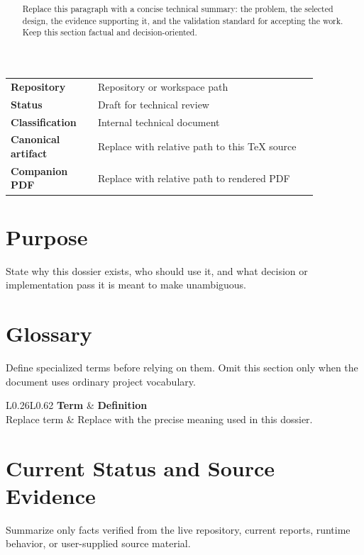 \documentclass[11pt]{article}
\title{\dossiertitle\\[0.35em]\large\dossiersubtitle}
\author{\dossierauthor}
\date{\preparedtimestamp}
\newcommand{\repo}{Repository or workspace path}
\newcommand{\artifactstatus}{Draft for technical review}
\newcommand{\classification}{Internal technical document}
\begin{document}
\maketitle

\begin{center}
\begin{tabular}{>{\bfseries}p{0.24\linewidth}p{0.62\linewidth}}
Repository & \repo \\
Status & \artifactstatus \\
Classification & \classification \\
Canonical artifact & Replace with relative path to this TeX source \\
Companion PDF & Replace with relative path to rendered PDF \\
\end{tabular}
\end{center}

\begin{abstract}
Replace this paragraph with a concise technical summary: the problem, the selected design, the evidence supporting it, and the validation standard for accepting the work. Keep this section factual and decision-oriented.
\end{abstract}

\tableofcontents
\newpage

\section{Purpose}
State why this dossier exists, who should use it, and what decision or implementation pass it is meant to make unambiguous.

\section{Glossary}
Define specialized terms before relying on them. Omit this section only when the document uses ordinary project vocabulary.

\begin{longtable}{L{0.26\linewidth}L{0.62\linewidth}}
\toprule
\textbf{Term} & \textbf{Definition} \\
\midrule
\endhead
Replace term & Replace with the precise meaning used in this dossier. \\
\bottomrule
\end{longtable}

\section{Current Status and Source Evidence}
Summarize only facts verified from the live repository, current reports, runtime behavior, or user-supplied source material.
\end{document}
